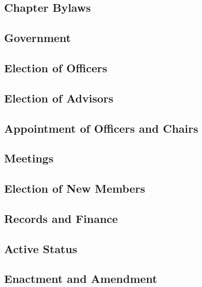 \documentclass[bylaws,final,10pt,withoutoptional,withoutpreface]{../bylaws}
\begin{document}
\frontmatter
\maketitle
%

%
\tableofcontents\newpage
\mainmatter
\begin{optionalpart}
\part{Chapter Bylaws}
\end{optionalpart}

\chapter{Government}\label{sec:gov}



\chapter{Election of Officers}\label{sec:oficElec}


\chapter{Election of Advisors}\label{sec:advElec}




\chapter{Appointment of Officers and Chairs}\label{sec:appointmentofficers}


\chapter{Meetings}\label{sec:meetings}


\chapter{Election of New Members}\label{sec:newElec}



\chapter{Records and Finance}\label{sec:records}



\chapter{Active Status}\label{sec:activeStatus}



\chapter{Enactment and Amendment}\label{sec:amendment}



\appendix





\end{document}
